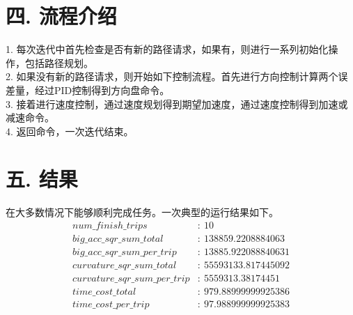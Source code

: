 \documentclass[12pt]{article}
\begin{document}
  \section*{四. 流程介绍}
  	1. 每次迭代中首先检查是否有新的路径请求，如果有，则进行一系列初始化操作，包括路径规划。\\
  	2. 如果没有新的路径请求，则开始如下控制流程。首先进行方向控制计算两个误差量，经过PID控制得到方向盘命令。\\
  	3. 接着进行速度控制，通过速度规划得到期望加速度，通过速度控制得到加速或减速命令。\\
  	4. 返回命令，一次迭代结束。\\
  \section*{五. 结果}
  	在大多数情况下能够顺利完成任务。一次典型的运行结果如下。
  	\begin{align*}
  		num\_finish\_trips&: \: 10\\
  		big\_acc\_sqr\_sum\_total&: \: 138859.2208884063\\
  		big\_acc\_sqr\_sum\_per\_trip&: \: 13885.922088840631\\
  		curvature\_sqr\_sum\_total&: \: 55593133.817445092\\
  		curvature\_sqr\_sum\_per\_trip&: \: 5559313.38174451\\
  		time\_cost\_total&: \: 979.88999999925386\\
  		time\_cost\_per\_trip&: \: 97.988999999925383\\
  	\end{align*}
 
\end{document}
